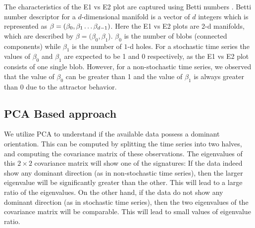 \documentclass[journal]{IEEEtran}
\begin{document}
The characteristics of the E1 vs E2 plot are captured using Betti numbers \cite{jmlr}. Betti number descriptor for a $d$-dimensional manifold is a vector of $d$ integers which is represented as $\beta = (\beta_0, \beta_1 \mathellipsis \beta_{d-1})$. Here the E1 vs E2 plots are 2-d manifolds, which are described by  $\beta=(\beta_{0}, \beta_{1}$).  $\beta_{0}$ is the number of blobs (connected components) while $\beta_1$ is the number of $1$-d holes. For a stochastic time series the values of $\beta_{0}$  and $\beta_1$ are expected to be 1 and 0 respectively, as the E1 vs E2 plot consists of one single blob. However, for a non-stochastic time series, we observed that the value of $\beta_{0}$ can be greater than 1 and the value of $\beta_1$ is always greater than 0 due to the attractor behavior.

\subsection{PCA Based approach}


We utilize PCA to understand if the available data possess a dominant orientation. This can be computed by splitting the time series into two halves, and computing the covariance matrix of these observations. The eigenvalues of this $2 \times 2$ covariance matrix will show one of the signatures: If the data indeed show any dominant direction (as in non-stochastic time series), then the larger eigenvalue will be significantly greater than the other. This will lead to a large ratio of the eigenvalues. On the other hand, if the data do not show any dominant direction (as in stochastic time series), then the two eigenvalues of the covariance matrix will be comparable. This will lead to small values of eigenvalue ratio.
\end{document}
